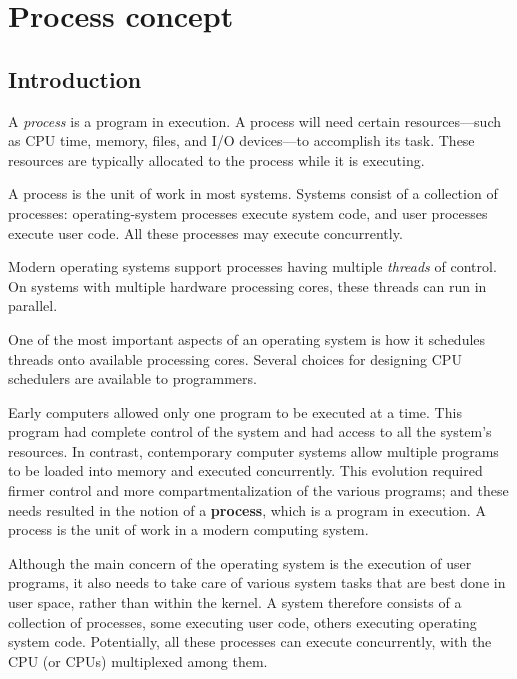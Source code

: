 \section{Process concept}

\subsection*{Introduction}
A \textit{process} is a program in execution. A process will need certain resources---such as CPU time, memory, files, and I/O devices---to accomplish its task. These resources are typically allocated to the process while it is executing.

A process is the unit of work in most systems. Systems consist of a collection of processes: operating-system processes execute system code, and user processes execute user code. All these processes may execute concurrently.

Modern operating systems support processes having multiple \textit{threads} of control. On systems with multiple hardware processing cores, these threads can run in parallel.

One of the most important aspects of an operating system is how it schedules threads onto available processing cores. Several choices for designing CPU schedulers are available to programmers.

Early computers allowed only one program to be executed at a time. This program had complete control of the system and had access to all the system's resources. In contrast, contemporary computer systems allow multiple programs to be loaded into memory and executed concurrently. This evolution required firmer control and more compartmentalization of the various programs; and these needs resulted in the notion of a \textbf{process}, which is a program in execution. A process is the unit of work in a modern computing system.

Although the main concern of the operating system is the execution of user programs, it also needs to take care of various system tasks that are best done in user space, rather than within the kernel. A system therefore consists of a collection of processes, some executing user code, others executing operating system code. Potentially, all these processes can execute concurrently, with the CPU (or CPUs) multiplexed among them.

